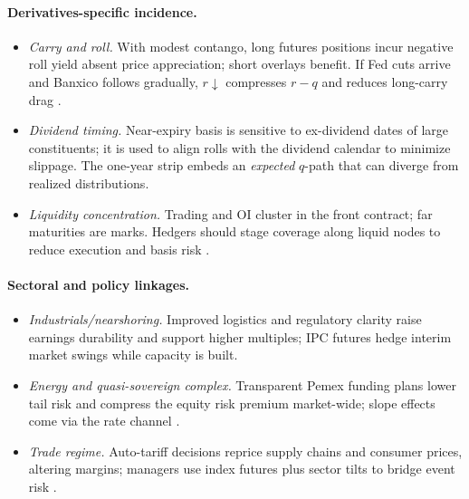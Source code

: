 \documentclass[11pt,a4paper]{article} %
\begin{document}
\paragraph{Derivatives-specific incidence.}
\begin{itemize}
  \item \textit{Carry and roll.} With modest contango, long futures positions incur negative roll yield absent price appreciation; short overlays benefit. If Fed cuts arrive and Banxico follows gradually, \(r\downarrow\) compresses \(r-q\) and reduces long-carry drag \citep{reuters_ipc_record_2025}.
  \item \textit{Dividend timing.} Near-expiry basis is sensitive to ex-dividend dates of large constituents; it is used to align rolls with the dividend calendar to minimize slippage. The one-year strip embeds an \emph{expected} \(q\)-path that can diverge from realized distributions.
  \item \textit{Liquidity concentration.} Trading and OI cluster in the front contract; far maturities are marks. Hedgers should stage coverage along liquid nodes to reduce execution and basis risk \citep{mexder_ipc_fut}.
\end{itemize}

\paragraph{Sectoral and policy linkages.}
\begin{itemize}
  \item \textit{Industrials/nearshoring.} Improved logistics and regulatory clarity raise earnings durability and support higher multiples; IPC futures hedge interim market swings while capacity is built.
  \item \textit{Energy and quasi-sovereign complex.} Transparent Pemex funding plans lower tail risk and compress the equity risk premium market-wide; slope effects come via the rate channel \citep{reuters_pemex_plan_2025}.
  \item \textit{Trade regime.} Auto-tariff decisions reprice supply chains and consumer prices, altering margins; managers use index futures plus sector tilts to bridge event risk \citep{reuters_tariffs_china_autos_2025}.
\end{itemize}
\end{document}
